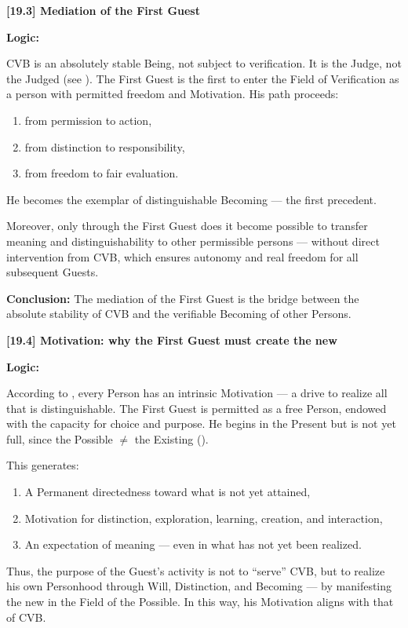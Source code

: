 \documentclass[12pt]{article}
\begin{document}
\bigskip

\textbf{[19.3] Mediation of the First Guest}

\textbf{Logic:}

CVB is an absolutely stable Being, not subject to verification. It is the Judge, not the Judged (see \text{[11.6]}). The First Guest is the first to enter the Field of Verification as a person with permitted freedom and Motivation. His path proceeds:
\begin{enumerate}
\item from permission to action,
\item from distinction to responsibility,
\item from freedom to fair evaluation.
\end{enumerate}

He becomes the exemplar of distinguishable Becoming — the first precedent.

Moreover, only through the First Guest does it become possible to transfer meaning and distinguishability to other permissible persons — without direct intervention from CVB, which ensures autonomy and real freedom for all subsequent Guests.

\textbf{Conclusion:} The mediation of the First Guest is the bridge between the absolute stability of CVB and the verifiable Becoming of other Persons.

\bigskip

\textbf{[19.4] Motivation: why the First Guest must create the new}

\textbf{Logic:}

According to \text{[12.3]}, every Person has an intrinsic Motivation — a drive to realize all that is distinguishable. The First Guest is permitted as a free Person, endowed with the capacity for choice and purpose. He begins in the Present but is not yet full, since the Possible $\neq$ the Existing (\text{[5]}).

This generates:
\begin{enumerate}
\item A Permanent directedness toward what is not yet attained,
\item Motivation for distinction, exploration, learning, creation, and interaction,
\item An expectation of meaning — even in what has not yet been realized.
\end{enumerate}

Thus, the purpose of the Guest's activity is not to ``serve'' CVB, but to realize his own Personhood through Will, Distinction, and Becoming — by manifesting the new in the Field of the Possible. In this way, his Motivation aligns with that of CVB.
\end{document}

